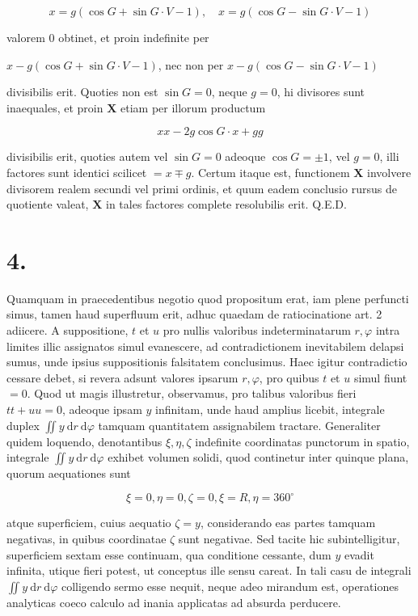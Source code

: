 \documentclass[10pt]{article}
\begin{document}
\[
x=g(\cos G+\sin G \cdot V-1), \quad x=g(\cos G-\sin G \cdot V-1)
\]

valorem 0 obtinet, et proin indefinite per

\(x-g(\cos G+\sin G \cdot V-1)\), nec non per \(x-g(\cos G-\sin G \cdot V-1)\)

divisibilis erit. Quoties non est \(\sin G=0\), neque \(g=0\), hi divisores sunt inaequales, et proin \(\boldsymbol{X}\) etiam per illorum productum

\[
x x-2 g \cos G \cdot x+g g
\]

divisibilis erit, quoties autem vel \(\sin G=0\) adeoque \(\cos G= \pm 1\), vel \(g=0\), illi factores sunt identici scilicet \(=x \mp g\). Certum itaque est, functionem \(\mathbf{X}\) involvere divisorem realem secundi vel primi ordinis, et quum eadem conclusio rursus de quotiente valeat, \(\boldsymbol{X}\) in tales factores complete resolubilis erit. Q.E.D.

\section*{4.}
Quamquam in praecedentibus negotio quod propositum erat, iam plene perfuncti simus, tamen haud superfluum erit, adhuc quaedam de ratiocinatione art. 2 adiicere. A suppositione, \(t\) et \(u\) pro nullis valoribus indeterminatarum \(r, \varphi\) intra limites illic assignatos simul evanescere, ad contradictionem inevitabilem delapsi sumus, unde ipsius suppositionis falsitatem conclusimus. Haec igitur contradictio cessare debet, si revera adsunt valores ipsarum \(r, \varphi\), pro quibus \(t\) et \(u\) simul fiunt \(=0\). Quod ut magis illustretur, observamus, pro talibus valoribus fieri \(t t+u u=0\), adeoque ipsam \(y\) infinitam, unde haud amplius licebit, integrale duplex \(\iint y \mathrm{~d} r \mathrm{~d} \varphi\) tamquam quantitatem assignabilem tractare. Generaliter quidem loquendo, denotantibus \(\xi, \eta, \zeta\) indefinite coordinatas punctorum in spatio, integrale \(\iint y \mathrm{~d} r \mathrm{~d} \varphi\) exhibet volumen solidi, quod continetur inter quinque plana, quorum aequationes sunt

\[
\xi=0, \eta=0, \zeta=0, \xi=R, \eta=360^{\circ}
\]

atque superficiem, cuius aequatio \(\zeta=y\), considerando eas partes tamquam negativas, in quibus coordinatae \(\zeta\) sunt negativae. Sed tacite hic subintelligitur, superficiem sextam esse continuam, qua conditione cessante, dum \(y\) evadit infinita, utique fieri potest, ut conceptus ille sensu careat. In tali casu de integrali \(\iint y \mathrm{~d} r \mathrm{~d} \varphi\) colligendo sermo esse nequit, neque adeo mirandum est, operationes analyticas coeco calculo ad inania applicatas ad absurda perducere.
\end{document}
